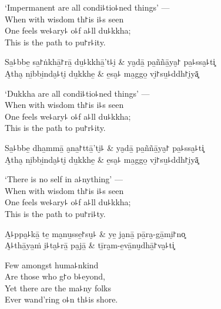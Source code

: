 \begin{english}
  `Impermanent are all condi꜕tio꜕ned things' ---\\
  When with wisdom th꜓is i꜕s seen\\
  One feels we꜕ary꜕ o꜕f a꜕ll du꜕kkha;\\
  This is the path to pu꜓r꜕ity.
\end{english}

\begin{twochants}
  Sa̱꜕bbe̱ sa̱꜓ṅkhā̱꜓rā̱ du̱꜕kkhā̱'t꜕i̮ & ya̮dā̱ pa̱ññā̱ya̮꜓ pa̱꜕ssa̮꜕ti͓ \\
  A̮tha̮ ni̱bbi̱nda̮꜕ti̮ du̱kkhe̱ & e̱sa̮꜕ ma̱ggo̱ vi̮꜓su̱꜕ddh꜓i̮yā͓ \\
\end{twochants}

\begin{english}
  `Dukkha are all condi꜕tio꜕ned things' ---\\
  When with wisdom th꜓is i꜕s seen\\
  One feels we꜕ary꜕ o꜕f a꜕ll du꜕kkha;\\
  This is the path to pu꜓r꜕ity.
\end{english}

\begin{twochants}
  Sa̱꜕bbe̱ dha̱mmā̱ a̮na̱꜓ttā̱'ti̮꜕ & ya̮dā̱ pa̱ññā̱ya̮꜓ pa̱꜕ssa̮꜕ti͓ \\
  A̮tha̮ ni̱bbi̱nda̮꜕ti̮ du̱kkhe̱ & e̱sa̮꜕ ma̱ggo̱ vi̮꜓su̱꜕ddh꜓i̮yā͓ \\
\end{twochants}

\begin{english}
  `There is no self in a꜕nything' ---\\
  When with wisdom th꜓is i꜕s seen\\
  One feels we꜕ary꜕ o꜕f a꜕ll du꜕kkha;\\
  This is the path to pu꜓ri꜕ty.
\end{english}

\clearpage

\begin{twochants}
  A̱꜕ppa̮꜕kā̱ te̱ ma̮nu̱sse̱꜓su̮꜕ & ye̱ ja̮nā̱ pā̱ra̮-gā̱mi̮꜓no͓ \\
  A̮꜕thā̱ya̱ṁ i̮꜕ta̮꜕rā̱ pa̮jā̱ & tī̱ra̮m-e̱vā̱nu̮dhā̱꜓va̮꜕ti͓ \\
\end{twochants}

\begin{english}
  Few amongst huma꜕nkind\\
  Are those who g꜓o b꜕eyond,\\
  Yet there are the ma꜕ny folks\\
  Ever wand'ring o꜕n th꜕is shore.
\end{english}

